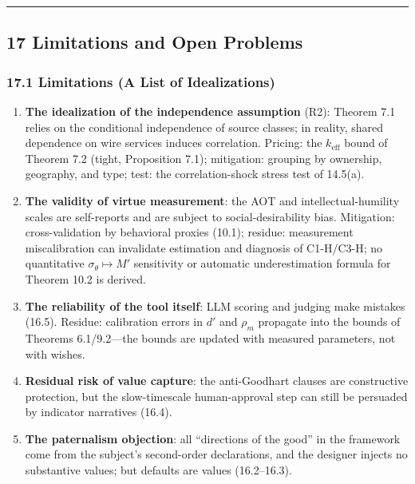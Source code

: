 \documentclass[
  11pt]{article}
\begin{document}
\begin{center}\rule{0.5\linewidth}{0.5pt}\end{center}

\subsection{17 Limitations and Open
Problems}\label{limitations-and-open-problems}

\subsubsection{17.1 Limitations (A List of
Idealizations)}\label{limitations-a-list-of-idealizations}

\begin{enumerate}
\def\labelenumi{\arabic{enumi}.}
\item
  \textbf{The idealization of the independence assumption} (R2): Theorem
  7.1 relies on the conditional independence of source classes; in
  reality, shared dependence on wire services induces correlation.
  Pricing: the \(k_{\mathrm{eff}}\) bound of Theorem 7.2 (tight,
  Proposition 7.1); mitigation: grouping by ownership, geography, and
  type; test: the correlation-shock stress test of 14.5(a).
\item
  \textbf{The validity of virtue measurement}: the AOT and
  intellectual-humility scales are self-reports and are subject to
  social-desirability bias. Mitigation: cross-validation by behavioral
  proxies (10.1); residue: measurement miscalibration can invalidate
  estimation and diagnosis of C1-H/C3-H; no quantitative
  \(\sigma_\theta\mapsto M'\) sensitivity or automatic underestimation
  formula for Theorem 10.2 is derived.
\item
  \textbf{The reliability of the tool itself}: LLM scoring and judging
  make mistakes (16.5). Residue: calibration errors in \(d'\) and
  \(\rho_m\) propagate into the bounds of Theorems 6.1/9.2---the bounds
  are updated with measured parameters, not with wishes.
\item
  \textbf{Residual risk of value capture}: the anti-Goodhart clauses are
  constructive protection, but the slow-timescale human-approval step
  can still be persuaded by indicator narratives (16.4).
\item
  \textbf{The paternalism objection}: all ``directions of the good'' in
  the framework come from the subject's second-order declarations, and
  the designer injects no substantive values; but defaults are values
  (16.2--16.3).

\end{enumerate}
\end{document}
